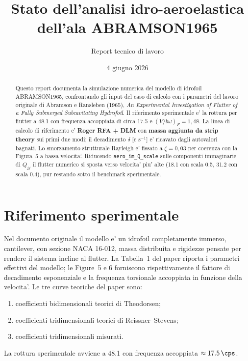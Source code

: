 \documentclass[11pt,a4paper]{article}
\title{Stato dell'analisi idro-aeroelastica dell'ala ABRAMSON1965}
\author{Report tecnico di lavoro}
\date{4 giugno 2026}
\begin{document}
\maketitle

\begin{abstract}
Questo report documenta la simulazione numerica del modello di idrofoil
ABRAMSON1965, confrontando gli input del caso di calcolo con i parametri del
lavoro originale di Abramson e Ransleben (1965), \emph{An Experimental Investigation of
Flutter of a Fully Submerged Subcavitating Hydrofoil}.
Il riferimento sperimentale e' la rottura per flutter a \SI{48.1}{\knunit} con
frequenza accoppiata di circa \SI{17.5}{\cps} e $(V/b\omega)_F=1{,}48$.
La linea di calcolo di riferimento e' \textbf{Roger RFA + DLM} con
\textbf{massa aggiunta da strip theory} sui primi due modi; il decadimento $\delta$
[e s$^{-1}$] e' ricavato dagli autovalori bagnati.
Lo smorzamento strutturale Rayleigh e' fissato a $\zeta=0{,}03$ per coerenza con la
Figura~5 a bassa velocita'.
Riducendo \texttt{aero\_im\_Q\_scale} sulle componenti immaginarie di $Q_{jj}$
il flutter numerico si sposta verso velocita' piu' alte
(\SI{18.1}{\knunit} con scala 0.5, \SI{31.2}{\knunit} con scala 0.4),
pur restando sotto il benchmark sperimentale.
\end{abstract}

\section{Riferimento sperimentale}

Nel documento originale il modello e' un idrofoil completamente immerso, cantilever, con
sezione NACA 16-012, massa distribuita e rigidezze pensate per rendere il sistema incline
al flutter. La Tabella~1 del paper riporta i parametri effettivi del modello; le Figure~5 e 6
forniscono rispettivamente il fattore di decadimento esponenziale e la frequenza torsionale
accoppiata in funzione della velocita'. Le tre curve teoriche del paper sono:
\begin{enumerate}
  \item coefficienti bidimensionali teorici di Theodorsen;
  \item coefficienti tridimensionali teorici di Reissner--Stevens;
  \item coefficienti tridimensionali misurati.
\end{enumerate}
La rottura sperimentale avviene a \SI{48.1}{\knunit} con frequenza accoppiata
$\approx\SI{17.5}{\cps}$.
\end{document}
